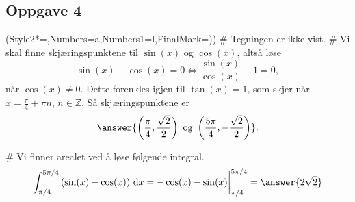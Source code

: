 \subsection*{Oppgave 4}

\begin{easylist}[enumerate]
	\ListProperties(Style2*=,Numbers=a,Numbers1=l,FinalMark={)})
	# Tegningen er ikke vist.
	# Vi skal finne skjæringspunktene til $\sin(x)$ og $\cos(x)$, altså løse 
	\begin{equation*}
	\sin(x)-\cos(x)=0 \Longleftrightarrow \frac{\sin(x)}{\cos(x)} - 1 = 0,
	\end{equation*}
	når $\cos(x)\neq 0$. Dette forenkles igjen til $\tan(x)=1$, som skjer når $x=\frac{\pi}{4} + \pi n$, $n \in \mathbb{Z}$. 
	Så skjæringspunktene er
	\begin{equation*}
	\answer{\left( \frac{\pi}{4}, \frac{\sqrt{2}}{2} \right) \text{ og } \left( \frac{5\pi}{4}, -\frac{\sqrt{2}}{{2}} \right)}.
	\end{equation*}
	
	# Vi finner arealet ved å løse følgende integral.
	\begin{equation*}
	\int_{\pi/4}^{5\pi/4} \left(\sin(x) - \cos(x)\right) \, \text{d}x = -\cos(x)-\sin(x)\bigg\vert_{\pi/4}^{5\pi/4} = \answer{2\sqrt{2}}
	\end{equation*}
\end{easylist}

